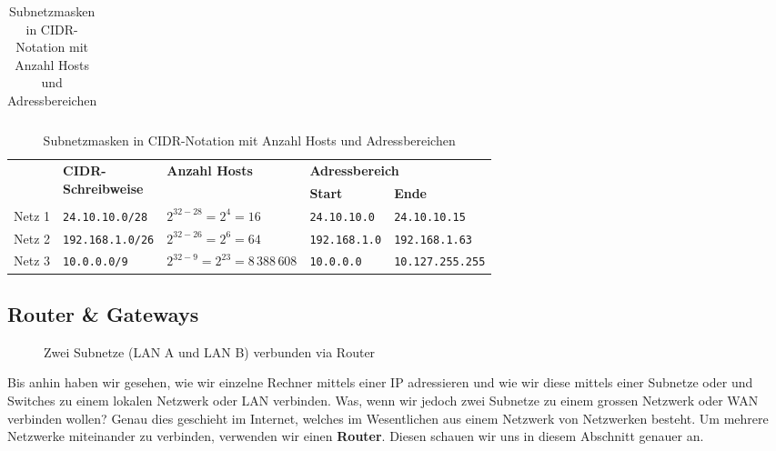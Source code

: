 \begin{myexercise}
\begin{table}[H]
\begin{tabular}{l||m{2.5cm}|m{2.25cm}|m{2.5cm}|m{2.5cm}}
			\end{tabular}
			\caption{Subnetzmasken in CIDR-Notation mit Anzahl Hosts und Adressbereichen}
		\end{table}
	\begin{myanswer}
		\begin{table}[H]
			\centering
			\begin{tabular}{l||l|m{2.5cm}|l|l}
								&  \multirow{2}{2cm}{\textbf{\gls{CIDR}-\newline Schreibweise}}&\multirow{2}{2.25cm}{\textbf{Anzahl Hosts}} & \multicolumn{2}{l}{\textbf{Adressbereich}} \\\cmidrule{4-5}
																& & & \textbf{Start} & \textbf{Ende} \\
												\midrule\midrule
												Netz 1 & \texttt{24.10.10.0/28} & $2^{32-28} = 2^{4} = 16$ & \texttt{24.10.10.0} & \texttt{24.10.10.15} \\\midrule
												Netz 2  & \texttt{192.168.1.0/26} & $2^{32-26} = 2^{6} = 64$& \texttt{192.168.1.0}           & \texttt{192.168.1.63}         \\
												\midrule
												Netz 3 & \texttt{10.0.0.0/9} & $2^{32-9} = 2^{23} = 8\,388\,608$     & \texttt{10.0.0.0}              & \texttt{10.127.255.255}       \\
												
			\end{tabular}
			\caption{Subnetzmasken in CIDR-Notation mit Anzahl Hosts und Adressbereichen}
		\end{table}
	\end{myanswer}
\end{myexercise}

\subsection{Router \& Gateways}
\begin{figure}[H]
	\centering
	
	\caption{Zwei Subnetze (\gls{LAN} A und \gls{LAN} B) verbunden via Router}
	\label{fig:router-subnetze}
\end{figure}
Bis anhin haben wir gesehen, wie wir einzelne Rechner mittels einer IP adressieren und wie wir diese mittels einer Subnetze oder  und Switches zu einem lokalen Netzwerk oder \gls{LAN} verbinden. Was, wenn wir jedoch zwei Subnetze zu einem grossen Netzwerk oder \gls{WAN} verbinden wollen? Genau dies geschieht im Internet, welches im Wesentlichen aus einem Netzwerk von Netzwerken besteht. Um mehrere Netzwerke miteinander zu verbinden, verwenden wir einen \textbf{Router}. Diesen schauen wir uns in diesem Abschnitt genauer an.

